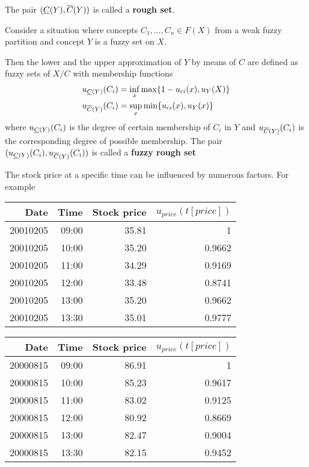 \documentclass[11pt]{article}
\begin{document}
The pair \((\underline{C}(Y),\overline{C}(Y))\) is called a \textbf{rough set}.

Consider a situation where concepts \(C_1,\dots,C_n\in F(X)\)  from a weak
fuzzy partition and concept \(Y\) is a fuzzy set on \(X\).

Then the lower and the upper approximation of \(Y\) by means of \(C\) are
defined as fuzzy sets of \(X/C\) with membership functions
\begin{align*}
&u_{\underline{C}(Y)}(C_i)=\inf_x\max\{1-u_{ci}(x),u_Y(X)\}\\
&u_{\overline{C}(Y)}(C_i)=\sup_x\min\{u_{ci}(x),u_Y(x)\}
\end{align*}
where \(u_{\underline{C}(Y)}(C_i)\) is the degree of certain membership of \(C_i\)
in \(Y\) and \(u_{\overline{C}(Y)}(C_i)\) is the corresponding degree of possible
membership. The pair \((u_{\underline{C}(Y)}(C_i),u_{\overline{C}(Y)}(C_i))\) is called
a \textbf{fuzzy rough set}

The stock price at a specific time can be influenced by numerous factors. For
example

\begin{center}
\begin{tabular}{rrrr}
\hline
Date & Time & Stock price & \(u_{price}(t[price])\)\\
\hline
20010205 & 09:00 & 35.81 & 1\\
20010205 & 10:00 & 35.20 & 0.9662\\
20010205 & 11:00 & 34.29 & 0.9169\\
20010205 & 12:00 & 33.48 & 0.8741\\
20010205 & 13:00 & 35.20 & 0.9662\\
20010205 & 13:30 & 35.01 & 0.9777\\
\hline
\end{tabular}
\end{center}

\begin{center}
\begin{tabular}{rrrr}
\hline
Date & Time & Stock price & \(u_{price}(t[price])\)\\
\hline
20000815 & 09:00 & 86.91 & 1\\
20000815 & 10:00 & 85.23 & 0.9617\\
20000815 & 11:00 & 83.02 & 0.9125\\
20000815 & 12:00 & 80.92 & 0.8669\\
20000815 & 13:00 & 82.47 & 0.9004\\
20000815 & 13:30 & 82.15 & 0.9452\\
\hline
\end{tabular}
\end{center}
\end{document}
